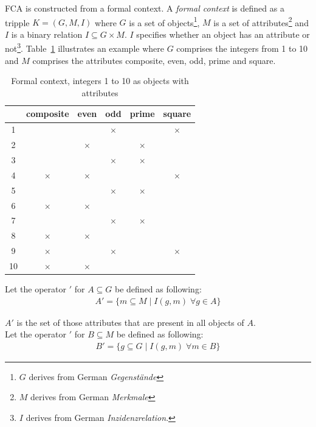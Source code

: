 \documentclass[11pt]{report}
\begin{document}
FCA \cite{Ganter2012} is constructed from a formal context. A \textit{formal context} is defined as a tripple $K = (G, M, I)$ where $G$ is a set of objects\footnote{$G$ derives from German \textit{Gegenstände}}, $M$ is a set of attributes\footnote{$M$ derives from German \textit{Merkmale}} and $I$ is a binary relation $I \subseteq G \times M$. $I$ specifies whether an object has an attribute or not\footnote{$I$ derives from German \textit{Inzidenzrelation}.}. Table~\ref{table:example} illustrates an example where $G$ comprises the integers from 1 to 10 and $M$ comprises the attributes composite, even, odd, prime and square. \\


\begin{table}[h]
\caption{Formal context, integers 1 to 10 as objects with attributes}
\label{table:example}
\centering

\def\arraystretch{1.2}%
\begin{tabular}{ | c | c c c c c |}
\hline
  & composite & even & odd & prime & square\\
\hline

1 & & & $\times$ & &$\times$\\ 
2 & & $\times$ & & $\times$ &\\
3 & & & $\times$ & $\times$ &\\ 
4 & $\times$ & $\times$ & & & $\times$\\
5 & & & $\times$ & $\times$ &\\
6 & $\times$ & $\times$ & & &\\
7 & & & $\times$ & $\times$ &\\ 
8 & $\times$ & $\times$ & & &\\
9 & $\times$ & & $\times$ & & $\times$\\
10 & $\times$ & $\times$ & & &\\ \hline


\end{tabular}
\end{table}

Let the operator $'$ for $A \subseteq G$ be defined as following:
\begin{align*}
	A' = \{ m \subseteq M\; |\;  I(g, m)\;   \forall g \in A\}
\end{align*}

$A'$ is the set of those attributes that are present in all objects of $A$. \\

Let the operator $'$ for $B \subseteq M$ be defined as following:
\begin{align*}
	B' = \{ g \subseteq G\; |\;  I(g, m)\;   \forall m \in B\}
\end{align*}
\end{document}
